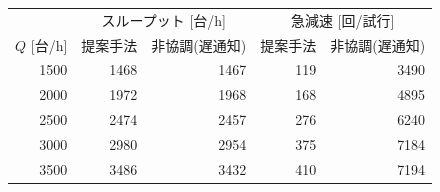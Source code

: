 \begin{tabular}{rrrrr}
\hline \hline
 & \multicolumn{2}{c}{スループット [台/h]} & \multicolumn{2}{c}{急減速 [回/試行]} \\
$Q$ [台/h] & 提案手法 & 非協調(遅通知) & 提案手法 & 非協調(遅通知) \\
\hline
1500 & 1468 & 1467 & 119 & 3490 \\
2000 & 1972 & 1968 & 168 & 4895 \\
2500 & 2474 & 2457 & 276 & 6240 \\
3000 & 2980 & 2954 & 375 & 7184 \\
3500 & 3486 & 3432 & 410 & 7194 \\
\hline
\end{tabular}
